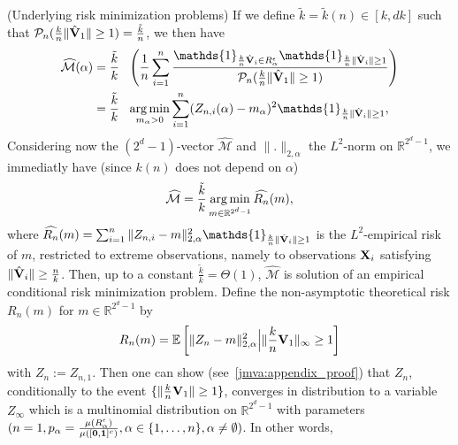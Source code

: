 \begin{remark}{(\sc Underlying risk minimization problems)}
If we define $\tilde k = \tilde k(n) \in [k, dk]$ such that $\mathcal{P}_n(\frac{k}{n} \| \hat{\mathbf V}_1 \| \ge 1) = \frac{\tilde k}{
   n}$, we then have  
\begin{align*}
\widehat{\mathcal{M}}(\alpha) &= \frac{\tilde k}{k} ~~ \left( \frac{1}{n} \sum_{i=1}^n \frac{\mathds{1}_{\frac{k}{n} \hat{\mb V}_i \in R_\alpha^\epsilon} \mathds{1}_{\frac{k}{n} \| \hat{\mb V}_i \| \ge 1}}{ \mathcal{P}_n(\frac{k}{n} \| \hat{\mb V}_1 \| \ge 1)}\right) \\
&= \frac{\tilde k}{k} ~~ \argmin_{m_\alpha > 0} \sum_{i=1}^n (Z_{n,i}(\alpha) - m_\alpha)^2 \mathds{1}_{\frac{k}{n} \| \hat{\mb V}_i \| \ge 1},
\end{align*}
Considering now the $(2^d -1)$-vector $\widehat{\mathcal{M}}$ and $\|.\|_{2, \alpha}$ the $L^2$-norm on $\mathbb{R}^{2^d-1}$, we immediatly have (since $k(n)$ does not depend on $\alpha$)
\begin{align}
\label{jmva:eq:optim_pb}
\widehat{\mathcal{M}} = \frac{\tilde k}{k} \argmin_{m \in \mathbb{R}^{2^d-1}} \widehat{R_n}(m),
\end{align}
where $\widehat{R_n}(m) = \sum_{i=1}^n \|Z_{n,i} - m\|_{2,\alpha}^2 \mathds{1}_{\frac{k}{n} \| \hat{\mb V}_i \| \ge 1}$ is the $L^2$-empirical risk of $m$, restricted to extreme observations, namely to observations $\mathbf X_i$ satisfying $\| \hat{\mathbf V}_i \| \ge \frac{n}{k}$. Then, up to a constant $\frac{\tilde k}{k} = \Theta(1)$, $\widehat{\mathcal{M}}$ is solution of an empirical conditional risk minimization problem. 
\noindent
Define the non-asymptotic theoretical risk $R_n(m)$ for $m \in \mathbb{R}^{2^d-1}$ by $$R_n(m) = \mathbb{E}\left[ \|Z_n - m\|_{2,\alpha}^2  \Big| \|\frac{k}{n} \mathbf V_1\|_\infty \ge 1\right]$$
with $Z_n:=Z_{n,1}$. Then one can show (see~\ref{jmva:appendix_proof}) that $Z_n$, conditionally to the event $\{\|\frac{k}{n} \mathbf V_1\| \ge 1\}$, converges in distribution to a variable $Z_\infty$ which is a multinomial distribution on $\mathbb{R}^{2^d-1}$ with parameters $(n=1, p_\alpha = \frac{\mu(R_\alpha^\epsilon)}{\mu([\mathbf 0, \mathbf 1]^c)}, \alpha \in \{1,\ldots,n\}, \alpha \neq \emptyset)$. In other words, 

\end{remark}
